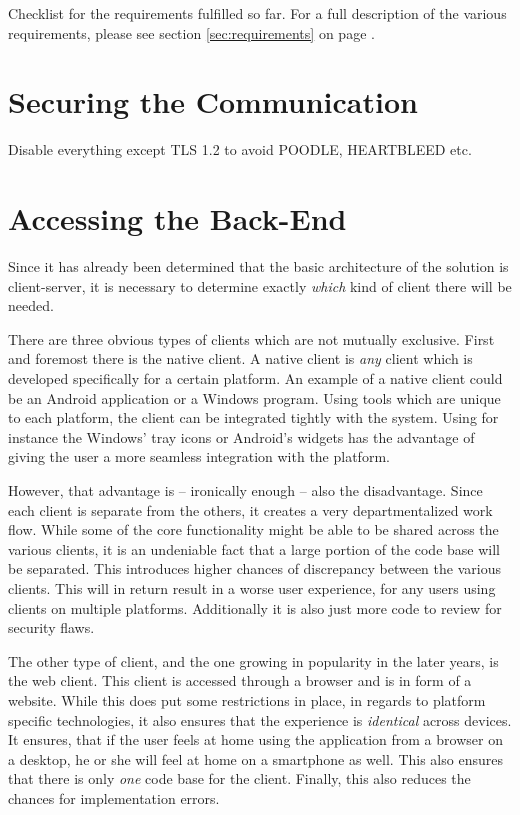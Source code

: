 \begin{table}
				\caption{Checklist for the requirements fulfilled so far. For a full description of the various requirements, please see section \ref{sec:requirements} on page \pageref{sec:requirements}.}
				\label{tab:checklist_arch-comms}
			\end{table}

	\section{Securing the Communication}
		Disable everything except TLS 1.2 to avoid POODLE, HEARTBLEED etc.

	\section{Accessing the Back-End}
		Since it has already been determined that the basic architecture of the solution is client-server, it is necessary to determine exactly \emph{which} kind of client there will be needed. 

		There are three obvious types of clients which are not mutually exclusive. First and foremost there is the native client. A native client is \emph{any} client which is developed specifically for a certain platform. An example of a native client could be an Android application or a Windows program. Using tools which are unique to each platform, the client can be integrated tightly with the system. Using for instance the Windows' tray icons or Android's widgets has the advantage of giving the user a more seamless integration with the platform. 

		However, that advantage is -- ironically enough -- also the disadvantage. Since each client is separate from the others, it creates a very departmentalized work flow. While some of the core functionality might be able to be shared across the various clients, it is an undeniable fact that a large portion of the code base will be separated. This introduces higher chances of discrepancy between the various clients. This will in return result in a worse user experience, for any users using clients on multiple platforms. Additionally it is also just more code to review for security flaws.

		The other type of client, and the one growing in popularity in the later years, is the web client. This client is accessed through a browser and is in form of a website. While this does put some restrictions in place, in regards to platform specific technologies, it also ensures that the experience is \emph{identical} across devices. It ensures, that if the user feels at home using the application from a browser on a desktop, he or she will feel at home on a smartphone as well. This also ensures that there is only \emph{one} code base for the client. Finally, this also reduces the chances for implementation errors.

